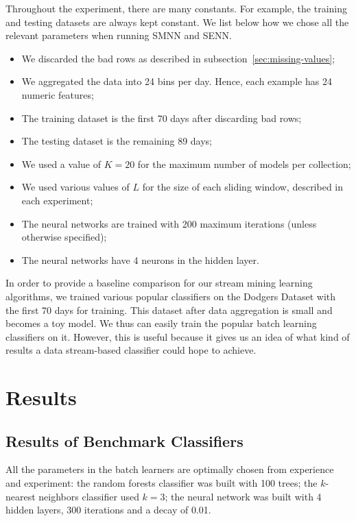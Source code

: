 \documentclass[conference]{IEEEtran}
\begin{document}
		Throughout the experiment, there are many constants. For example, the training and testing datasets are always kept constant. We list below how we chose all the relevant parameters when running SMNN and SENN. 
		\begin{itemize}
			\item We discarded the bad rows as described in subsection~\ref{sec:missing-values};
			\item We aggregated the data into 24 bins per day. Hence, each example has 24 numeric features;
			\item The training dataset is the first 70 days after discarding bad rows;
			\item The testing dataset is the remaining 89 days;
			\item We used a value of $K=20$ for the maximum number of models per collection;
			\item We used various values of $L$ for the size of each sliding window, described in each experiment;
			\item The neural networks are trained with 200 maximum iterations (unless otherwise specified);
			\item The neural networks have 4 neurons in the hidden layer.
		\end{itemize}
		
		In order to provide a baseline comparison for our stream mining learning algorithms, we trained various popular classifiers on the Dodgers Dataset with the first 70 days for training. This dataset after data aggregation is small and becomes a toy model. We thus can easily train the popular batch learning classifiers on it. However, this is useful because it gives us an idea of what kind of results a data stream-based classifier could hope to achieve.
		
		\section{Results}
		\label{sec:experiments-and-results}
		
		\subsection{Results of Benchmark Classifiers}
		All the parameters in the batch learners are optimally chosen from experience and experiment: the random forests classifier was built with 100 trees; the $k$-nearest neighbors classifier used $k=3$; the neural network was built with 4 hidden layers, 300 iterations and a decay of 0.01.
		
\end{document}
